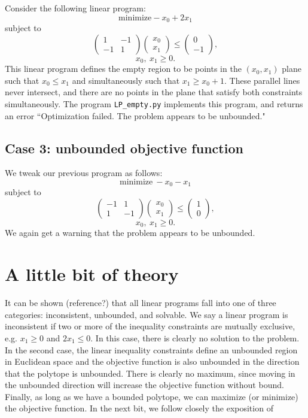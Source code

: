 \documentclass[12pt,english]{article}
\begin{document}
Consider the following linear program:
$$
\text{minimize} -x_0 + 2x_1
$$
subject to
$$
\left(
\begin{array}{cc}
1	&	-1	\\
-1	&	1	
\end{array}
\right)
\left(
\begin{array}{c}
x_0 \\
x_1
\end{array}
\right)
\leq 
\left(
\begin{array}{c}
0 	\\
-1
\end{array}
\right),
$$
$$
x_0,~x_1 \geq 0.
$$
This linear program defines the empty region to be points in the $(x_0,x_1)$ plane such that $x_0 \leq x_1$ and simultaneously such that $x_1 \geq x_0 +1$.  These parallel lines never intersect, and there are no points in the plane that satisfy both constraints simultaneously.  The program \texttt{LP\_empty.py} implements this program, and returns an error ``Optimization failed. The problem appears to be unbounded." \\

\subsection*{Case 3: unbounded objective function}
We tweak our previous program as follows:
$$
\text{minimize} ~-x_0 - x_1
$$
subject to
$$
\left(
\begin{array}{cc}
-1	&	1	\\
1	&	-1	
\end{array}
\right)
\left(
\begin{array}{c}
x_0 \\
x_1
\end{array}
\right)
\leq 
\left(
\begin{array}{c}
1 	\\
0
\end{array}
\right),
$$
$$
x_0,~x_1 \geq 0.
$$
We again get a warning that the problem appears to be unbounded.

\section{A little bit of theory}

It can be shown (reference?) that all linear programs fall into one of three categories: inconsistent, unbounded, and solvable.  We say a linear program is inconsistent if two or more of the inequality constraints are mutually exclusive, e.g. $x_1 \geq 0$ and $2 x_1 \leq 0$.  In this case, there is clearly no solution to the problem.   In the second case, the linear inequality constraints define an unbounded region in Euclidean space and the objective function is also unbounded in the direction that the polytope is unbounded.  There is clearly no maximum, since moving in the unbounded direction will increase the objective function without bound.  Finally, as long as we have a bounded polytope, we can maximize (or minimize) the objective function.  In the next bit, we follow closely the exposition of \cite{BaJaSh:1990} \\
\end{document}
